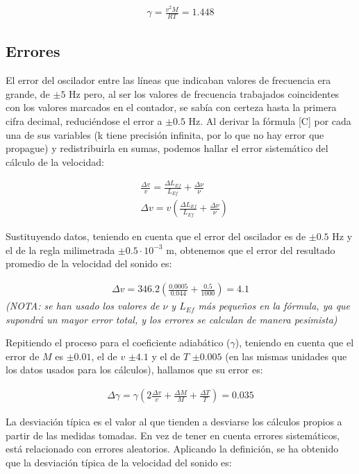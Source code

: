 \documentclass[fleqn,usenatbib,openbib]{mnras}
\begin{document}
\begin{gather}
    \gamma = \frac{v^{2}M}{RT} = \boxed{1.448}
\end{gather}

\subsection{Errores}

El error del oscilador entre las líneas que indicaban valores de frecuencia era grande, de $\pm5$ Hz pero, al ser los valores de frecuencia trabajados coincidentes con los valores marcados en el contador, se sabía con certeza hasta la primera cifra decimal, reduciéndose el error a $\pm0.5$ Hz. Al derivar la fórmula [C] por cada una de sus variables (k tiene precisión infinita, por lo que no hay error que propague) y redistribuirla en sumas, podemos hallar el error sistemático del cálculo de la velocidad:

\begin{align}
    & \frac{\Delta v}{v} = \frac{\Delta L_{Ef}}{L_{Ef}}+\frac{\Delta\nu}{\nu}\\
    & \Delta v = v(\frac{\Delta L_{Ef}}{L_{Ef}}+\frac{\Delta\nu}{\nu})
\end{align}

Sustituyendo datos, teniendo en cuenta que el error del oscilador es de $\pm0.5$ Hz y el de la regla milimetrada $\pm0.5\cdot10^{-3}$ m, obtenemos que el error del resultado promedio de la velocidad del sonido es:

\begin{gather}
    \Delta v = 346.2(\frac{0.0005}{0.044}+\frac{0.5}{1000}) = \boxed{4.1}
\end{gather}
\textit{(NOTA: se han usado los valores de $\nu$ y $L_{Ef}$ más pequeños en la fórmula, ya que supondrá un mayor error total, y los errores se calculan de manera pesimista)}

Repitiendo el proceso para el coeficiente adiabático ($\gamma$), teniendo en cuenta que el error de $M$ es $\pm0.01$, el de $v$ $\pm4.1$ y el de $T$ $\pm0.005$ (en las mismas unidades que los datos usados para los cálculos), hallamos que su error es:

\begin{gather}
    \Delta\gamma = \gamma(2\frac{\Delta v}{v}+\frac{\Delta M}{M}+\frac{\Delta T}{T}) = \boxed{0.035}
\end{gather}

\smallskip

La desviación típica es el valor al que tienden a desviarse los cálculos propios a partir de las medidas tomadas. En vez de tener en cuenta errores sistemáticos, está relacionado con errores aleatorios. Aplicando la definición, se ha obtenido que la desviación típica de la velocidad del sonido es:
\end{document}
